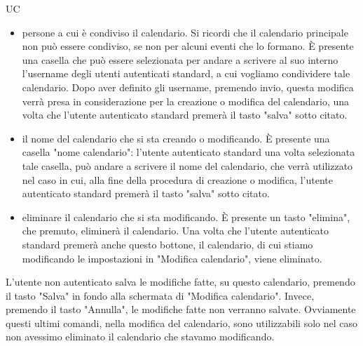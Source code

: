 \begin{listaPersonale}{UC}
\begin{listaPersonale2}[UC] {}
\begin{enumerate}
\begin{itemize}
                          \item persone a cui è condiviso il calendario. Si ricordi che il calendario principale non può essere condiviso, se non per alcuni eventi che lo formano. È presente una casella che può essere selezionata per andare a scrivere al suo interno l'username degli utenti autenticati standard, a cui vogliamo condividere tale calendario.
                                Dopo aver definito gli username, premendo invio, questa modifica verrà presa in considerazione per la creazione o modifica del calendario, una volta che l'utente autenticato standard premerà il tasto "salva" sotto citato.
                          \item il nome del calendario che si sta creando o modificando. È presente una casella "nome calendario": l'utente autenticato standard una volta selezionata tale casella, può andare a scrivere il nome del calendario, che verrà utilizzato nel caso in cui, alla fine della procedura di creazione o modifica, l'utente autenticato standard premerà il tasto "salva" sotto citato.
                          \item eliminare il calendario che si sta modificando. È presente un tasto "elimina", che premuto, eliminerà il calendario. Una volta che l'utente autenticato standard premerà anche questo bottone, il calendario, di cui stiamo modificando le impostazioni in "Modifica calendario", viene eliminato.
                      \end{itemize}
                      L'utente non autenticato salva le modifiche fatte, su questo calendario, premendo il tasto "Salva" in fondo alla schermata di "Modifica calendario". Invece, premendo il tasto "Annulla", le modifiche fatte non verranno salvate. Ovviamente questi ultimi comandi, nella modifica del calendario, sono utilizzabili solo nel caso non avessimo eliminato il calendario che stavamo modificando.
            \end{enumerate}



\end{listaPersonale2}
\end{listaPersonale}
